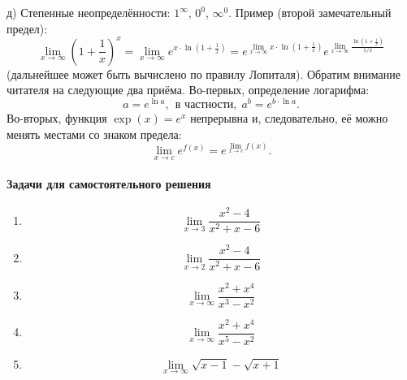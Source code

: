д) Степенные неопределённости: $1^\infty$, $0^0$, $\infty^0$.
Пример (второй замечательный предел):
\begin{equation}
	\lim_{x \to \infty}\left(1 + \frac{1}{x}\right)^x =
	\lim_{x \to \infty}e^{x \cdot \ln\left(1 + \frac{1}{x}\right)} =
	e^{\lim_{x \to \infty} x \cdot \ln\left(1 + \frac{1}{x}\right)}
	e^{\lim_{x \to \infty} \frac{\ln\left(1 + \frac{1}{x}\right)}{1/x}}
\end{equation}
(дальнейшее может быть вычислено по правилу Лопиталя).
Обратим внимание читателя на следующие два приёма.
Во-первых, определение логарифма:
\begin{equation}
	a = e^{\ln a}, ~~\mbox{в частности,}~~  a^b = e^{b\cdot \ln a}
	.
\end{equation}
Во-вторых, функция $\exp(x)=e^x$ непрерывна и, следовательно, её можно менять местами со знаком предела:
\begin{equation}
	\lim_{x \to c} e^{f(x)} = e^{ \lim_{x \to c}f(x)}
	.
\end{equation}


\paragraph{Задачи для самостоятельного решения}
\begin{enumerate}
	\item
		\begin{equation}
			\lim_{x\to3}\frac{x^2-4}{x^2+x-6}
		\end{equation}
	\item
		\begin{equation}
			\lim_{x\to2}\frac{x^2-4}{x^2+x-6}
		\end{equation}
	\item
		\begin{equation}
			\lim_{x\to\infty}\frac{x^2+x^4}{x^3-x^2}
		\end{equation}
	\item
		\begin{equation}
			\lim_{x\to\infty}\frac{x^2+x^4}{x^5-x^2}
		\end{equation}
	\item
		\begin{equation}
	\lim_{x\to \infty} \sqrt{x-1} - \sqrt{x+1}
		\end{equation}
\end{enumerate}
